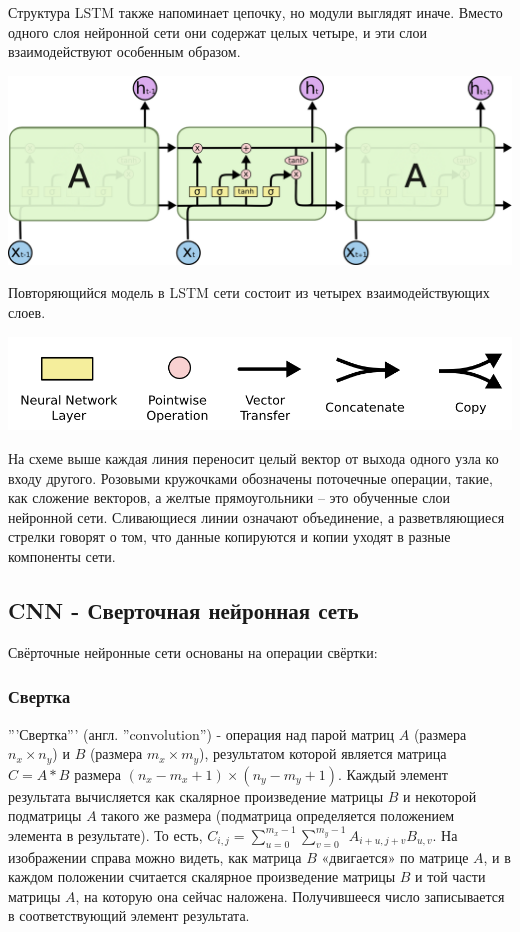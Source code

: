 \documentclass[12pt, a4paper, titlepage]{extreport}
\begin{document}
	Структура LSTM также напоминает цепочку, но модули выглядят иначе. Вместо одного слоя нейронной сети они содержат целых четыре, и эти слои взаимодействуют особенным образом.
	\begin{center} 
		\includegraphics[scale=0.2]{lstm_act.png}\\
	\end{center}
	Повторяющийся модель в LSTM сети состоит из четырех взаимодействующих слоев.
	\begin{center} 
		\includegraphics[scale=0.4]{layers_lstm.png}\\
	\end{center}
	На схеме выше каждая линия переносит целый вектор от выхода одного узла ко входу другого. Розовыми кружочками обозначены поточечные операции, такие, как сложение векторов, а желтые прямоугольники – это обученные слои нейронной сети. Сливающиеся линии означают объединение, а разветвляющиеся стрелки говорят о том, что данные копируются и копии уходят в разные компоненты сети.
	\subsection*{CNN - Сверточная нейронная сеть}
	Свёрточные нейронные сети основаны на операции свёртки:\\
	 \subsubsection*{Свертка}
	'''Свертка''' (англ. ''convolution'') - операция над парой матриц $A$ (размера $n_x\times n_y$) и $B$ (размера $m_x \times m_y$), результатом которой является матрица $C = A * B$ размера $(n_x-m_x+1)\times (n_y-m_y+1)$.
	Каждый элемент результата вычисляется как скалярное произведение матрицы $B$ и некоторой подматрицы $A$ такого же размера (подматрица определяется положением элемента в результате).
	То есть, $C_{i,j} = \sum_{u = 0}^{m_x-1}\sum_{v = 0}^{m_y - 1}A_{i+u,j+v}B_{u,v}$. На изображении справа можно видеть, как матрица $B$ «двигается» по матрице $A$, и в каждом положении считается скалярное произведение матрицы $B$ и той части матрицы $A$, на которую она сейчас наложена. Получившееся число записывается в соответствующий элемент результата.
\end{document}
